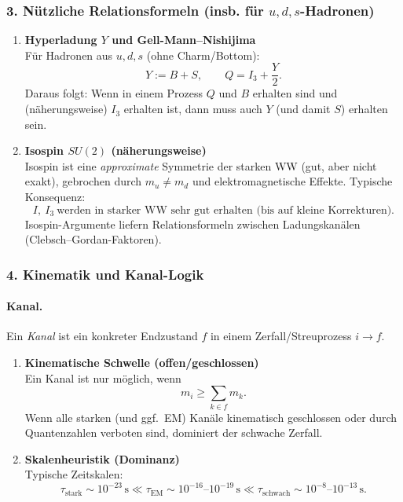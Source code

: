 \documentclass[10pt, letterpaper]{article}
\begin{document}
\subsubsection*{3. Nützliche Relationsformeln (insb. für $u,d,s$-Hadronen)}

\begin{enumerate}
\item \textbf{Hyperladung $Y$ und Gell-Mann--Nishijima}\\
Für Hadronen aus $u,d,s$ (ohne Charm/Bottom):
\[
Y := B + S,
\qquad
Q = I_3 + \frac{Y}{2}.
\]
Daraus folgt: Wenn in einem Prozess $Q$ und $B$ erhalten sind und (näherungsweise) $I_3$ erhalten ist,
dann muss auch $Y$ (und damit $S$) erhalten sein.

\item \textbf{Isospin $SU(2)$ (näherungsweise)}\\
Isospin ist eine \emph{approximate} Symmetrie der starken WW (gut, aber nicht exakt), gebrochen durch
$m_u\neq m_d$ und elektromagnetische Effekte. Typische Konsequenz:
\[
I,\ I_3 \ \text{werden in starker WW sehr gut erhalten (bis auf kleine Korrekturen).}
\]
Isospin-Argumente liefern Relationsformeln zwischen Ladungskanälen (Clebsch--Gordan-Faktoren).
\end{enumerate}

\subsubsection*{4. Kinematik und \glqq Kanal\grqq-Logik}

\paragraph{Kanal.} Ein \emph{Kanal} ist ein konkreter Endzustand $f$ in einem Zerfall/Streuprozess $i\to f$.

\begin{enumerate}
\item \textbf{Kinematische Schwelle (offen/geschlossen)}\\
Ein Kanal ist nur möglich, wenn
\[
m_i \ge \sum_{k\in f} m_k.
\]
Wenn alle starken (und ggf.\ EM) Kanäle kinematisch geschlossen oder durch Quantenzahlen verboten sind,
dominiert der schwache Zerfall.

\item \textbf{Skalenheuristik (Dominanz)}\\
Typische Zeitskalen:
\[
\tau_{\text{stark}}\sim 10^{-23}\,\mathrm s \ll 
\tau_{\text{EM}}\sim 10^{-16}\text{--}10^{-19}\,\mathrm s \ll
\tau_{\text{schwach}}\sim 10^{-8}\text{--}10^{-13}\,\mathrm s.
\]
\end{enumerate}
\end{document}
